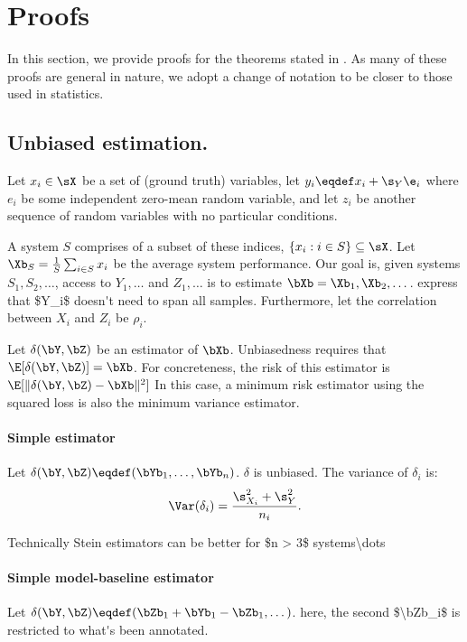 \onecolumn

\section{\label{sec:proofs}Proofs}

In this section, we provide proofs for the theorems stated in .
As many of these proofs are general in nature, we adopt a change of notation to be closer to those used in statistics. 

\subsection{Unbiased estimation.}

Let $x_i \in \sX$ be a set of (ground truth) variables,
let $y_i \eqdef x_i + \s_Y\e_i$ where $e_i$ be some independent zero-mean random variable,
and let $z_i$ be another sequence of random variables with no particular conditions.

A system $S$ comprises of a subset of these indices, $\{x_i: i \in S\} \subseteq \sX$.
Let $\Xb_S = \frac{1}{S} \sum_{i \in S} x_i$ be the average system performance.
Our goal is, given systems $S_1, S_2, \dots$, access to $Y_1, \dots$ and $Z_1, \dots$ is to estimate $\bXb = \Xb_1, \Xb_2, \dots$. \ac{express that $Y_i$ doesn't need to span all samples.}
Furthermore, let the correlation between $X_i$ and $Z_i$ be $\rho_i$.

Let $\delta(\bY, \bZ)$ be an estimator of $\bXb$.
Unbiasedness requires that $\E[\delta(\bY, \bZ)] = \bXb$.
For concreteness, the risk of this estimator is $\E[\|\delta(\bY, \bZ) - \bXb\|^2]$
In this case, a minimum risk estimator using the squared loss is also the minimum variance estimator.

\paragraph{Simple estimator}
Let $\delta(\bY, \bZ) \eqdef (\bYb_1, \dots, \bYb_n)$.
$\delta$ is unbiased.
The variance of $\delta_i$ is:
\[
\Var(\delta_i) = \frac{\s^2_{X_i} + \s^2_Y}{n_i}.
\]

\ac{Technically Stein estimators can be better for $n > 3$ systems\dots}

\paragraph{Simple model-baseline estimator}
Let $\delta(\bY, \bZ) \eqdef (\bZb_1 + \bYb_1 - \bZb_1, \dots)$. \ac{here, the second $\bZb_i$ is restricted to what's been annotated.}

